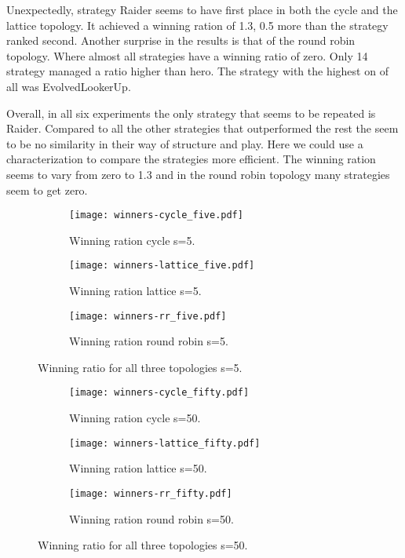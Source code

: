 Unexpectedly, strategy Raider seems to have first place in both
the cycle and the lattice topology. It achieved a winning ration of 1.3, 0.5
more than the strategy ranked second. Another surprise in the results is
that of the round robin topology. Where almost all strategies have a winning ratio
of zero. Only 14 strategy managed a ratio higher than hero. The strategy with
the highest on of all was EvolvedLookerUp.

Overall, in all six experiments the only strategy that seems to be repeated is
Raider. Compared to all the other strategies that outperformed the rest the seem
to be no similarity in their way of structure and play. Here we could use
a characterization to compare the strategies more efficient. The winning ration
seems to vary from zero to 1.3 and in the round robin topology many strategies
seem to get zero.


\begin{figure}[H]
\centering
    \begin{subfigure}[t]{1\textwidth}
    \centering
        \texttt{[image: winners-cycle\_five.pdf]}
    \caption{Winning ration cycle s=5.}
    \end{subfigure}
\hfill
    \begin{subfigure}[t]{1\textwidth}\centering
    \centering
        \texttt{[image: winners-lattice\_five.pdf]}
    \caption{Winning ration lattice s=5.}
    \end{subfigure}
\hfill
    \begin{subfigure}[t]{1\textwidth}\centering
    \centering
        \texttt{[image: winners-rr\_five.pdf]}
    \caption{Winning ration round robin s=5.}
    \end{subfigure}
\caption{Winning ratio for all three topologies s=5.}
\label{fig:winning-five}
\end{figure}

\begin{figure}[H]
\centering
    \begin{subfigure}[t]{1\textwidth}
    \centering
        \texttt{[image: winners-cycle\_fifty.pdf]}
    \caption{Winning ration cycle s=50.}
    \end{subfigure}
\hfill
    \begin{subfigure}[t]{1\textwidth}\centering
    \centering
        \texttt{[image: winners-lattice\_fifty.pdf]}
    \caption{Winning ration lattice s=50.}
    \end{subfigure}
\hfill
    \begin{subfigure}[t]{1\textwidth}\centering
    \centering
        \texttt{[image: winners-rr\_fifty.pdf]}
    \caption{Winning ration round robin s=50.}
    \end{subfigure}
\caption{Winning ratio for all three topologies s=50.}
\label{fig:winning-fifty}
\end{figure}

